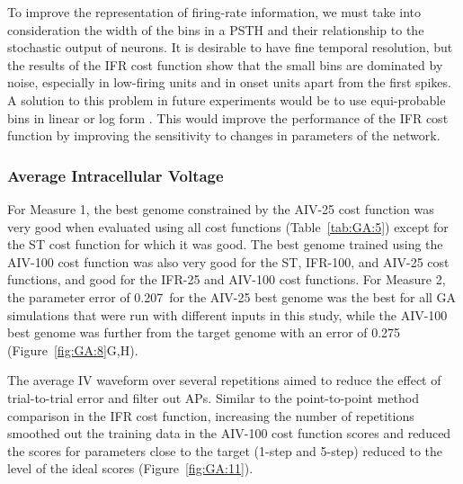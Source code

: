 \smallskip{}

To improve the representation of firing-rate information, we must take into
consideration the width of the bins in a PSTH and their relationship to the
stochastic output of neurons.  It is desirable to have fine temporal
resolution, but the results of the IFR cost function show that the small
bins are dominated by noise, especially in low-firing units and in onset
units apart from the first spikes. A solution to this problem in future
experiments would be to use equi-probable bins in linear or log form
\cite{BhumbraInyushkinEtAl:2004}.  This would improve the performance of
the IFR cost function by improving the sensitivity to changes in parameters
of the network.

\subsubsection{Average Intracellular Voltage}\label{sec:GA:aver-intr-volt-summ}

For Measure 1, the best genome constrained by the AIV-25 cost function was very
good when evaluated using all cost functions (Table~\ref{tab:GA:5}) except for the
ST cost function for which it was good. The best genome trained using the
AIV-100 cost function was also very good for the ST, IFR-100, and AIV-25 cost
functions, and good for the IFR-25 and AIV-100 cost
functions.  %
For Measure 2, the parameter error of 0.207~for the AIV-25 best genome was the
best for all GA simulations that were run with different inputs in this study,
while the AIV-100 best genome was further from the target genome with an error
of 0.275 (Figure~\ref{fig:GA:8}G,H).

\smallskip{}

The average IV waveform over several repetitions aimed to reduce the effect
of trial-to-trial error and filter out APs.  Similar to the point-to-point
method comparison in the IFR cost function, increasing the number of
repetitions smoothed out the training data in the AIV-100 cost function
scores and reduced the scores for parameters close to the target (1-step
and 5-step) reduced to the level of the ideal scores
(Figure~\ref{fig:GA:11}).

